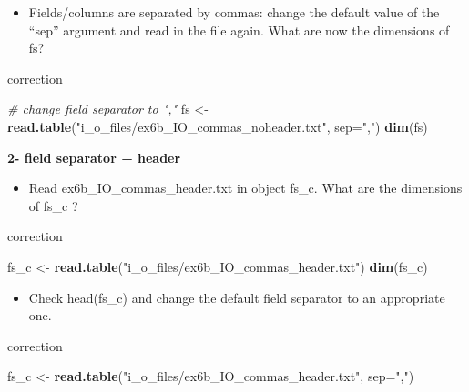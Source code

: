 \documentclass[]{book}
\newenvironment{Shaded}{\begin{snugshade}}{\end{snugshade}}
\newcommand{\CommentTok}[1]{\textcolor[rgb]{0.56,0.35,0.01}{\textit{#1}}}
\newcommand{\DataTypeTok}[1]{\textcolor[rgb]{0.13,0.29,0.53}{#1}}
\newcommand{\KeywordTok}[1]{\textcolor[rgb]{0.13,0.29,0.53}{\textbf{#1}}}
\newcommand{\NormalTok}[1]{#1}
\newcommand{\StringTok}[1]{\textcolor[rgb]{0.31,0.60,0.02}{#1}}
\providecommand{\tightlist}{%
  \setlength{\itemsep}{0pt}\setlength{\parskip}{0pt}}
\begin{document}
\begin{itemize}
\tightlist
\item
  Fields/columns are separated by commas: change the default value of the ``sep'' argument and read in the file again.
  What are now the dimensions of fs?
\end{itemize}

correction

\begin{Shaded}
\begin{Highlighting}[]
\CommentTok{# change field separator to ","}
\NormalTok{fs <-}\StringTok{ }\KeywordTok{read.table}\NormalTok{(}\StringTok{"i_o_files/ex6b_IO_commas_noheader.txt"}\NormalTok{, }
    \DataTypeTok{sep=}\StringTok{","}\NormalTok{)}
\KeywordTok{dim}\NormalTok{(fs)}
\end{Highlighting}
\end{Shaded}

\textbf{2- field separator + header}

\begin{itemize}
\tightlist
\item
  Read ex6b\_IO\_commas\_header.txt in object fs\_c.
  What are the dimensions of fs\_c ?
\end{itemize}

correction

\begin{Shaded}
\begin{Highlighting}[]
\NormalTok{fs_c <-}\StringTok{ }\KeywordTok{read.table}\NormalTok{(}\StringTok{"i_o_files/ex6b_IO_commas_header.txt"}\NormalTok{)}
\KeywordTok{dim}\NormalTok{(fs_c)}
\end{Highlighting}
\end{Shaded}

\begin{itemize}
\tightlist
\item
  Check head(fs\_c) and change the default field separator to an appropriate one.
\end{itemize}

correction

\begin{Shaded}
\begin{Highlighting}[]
\NormalTok{fs_c <-}\StringTok{ }\KeywordTok{read.table}\NormalTok{(}\StringTok{"i_o_files/ex6b_IO_commas_header.txt"}\NormalTok{, }
                   \DataTypeTok{sep=}\StringTok{","}\NormalTok{)}
\end{Highlighting}
\end{Shaded}
\end{document}
